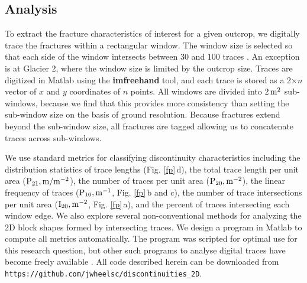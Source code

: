 \documentclass[review]{igs}
\begin{document}
\subsection{Analysis}

To extract the fracture characteristics of interest for a given outcrop, we digitally trace the fractures within a rectangular window. The window size is selected so that each side of the window intersects between 30 and 100 traces \citep{Priest2012}. An exception is at Glacier 2, where the window size is limited by the outcrop size. Traces are digitized in Matlab using the {\bf imfreehand} tool, and each trace is stored as a 2$\times n$ vector of $x$ and $y$ coordinates of $n$ points. All windows are divided into 2\,$\rm m^{2}$ sub-windows, because we find that this provides more consistency than setting the sub-window size on the basis of ground resolution. Because fractures extend beyond the sub-window size, all fractures are tagged allowing us to concatenate traces across sub-windows. 

We use standard metrics for classifying discontinuity characteristics \citep[e.g.][]{Priest2012} including the distribution statistics of trace lengths (Fig. \ref{fp}\,d), the total trace length per unit area ($\rm{P_{21}, m/m^{-2}}$), the number of traces per unit area ($\rm{P_{20}, m^{-2}}$), the linear frequency of traces ($\rm{P_{10}, m^{-1}}$, Fig. \ref{fp}\,b and c), the number of trace intersections per unit area ($\rm{I_{20}, m^{-2}}$, Fig. \ref{fp}\,a), and the percent of traces intersecting each window edge. We also explore several non-conventional methods for analyzing the 2D block shapes formed by intersecting traces. We design a program in Matlab to compute all metrics automatically. The program was scripted for optimal use for this research question, but other such programs to analyse digital traces have become freely available \citep[e.g.][]{Healy2016}. All code described herein can be downloaded from \verb+https://github.com/jwheelsc/discontinuities_2D+. 
\end{document}
